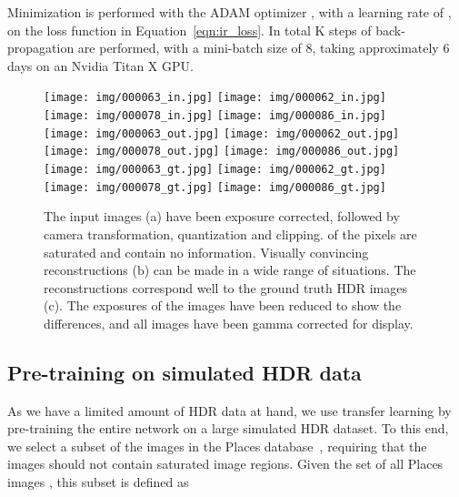 \documentclass[acmtog]{acmart}
\newcommand{\eqnref}[1]{Equation~\ref{eqn:#1}}
\begin{document}
Minimization is performed with the ADAM optimizer \cite{Kingma2014}, with a learning rate of , on the loss function in \eqnref{ir_loss}. In total K steps of back-propagation are performed, with a mini-batch size of 8, taking approximately 6 days on an Nvidia Titan X GPU.

\begin{figure*}
	\vspace{5pt}
	\newcommand\ww{0.241}
	\newcommand\hpad{\hspace{3pt}}
	\newcommand\vpad{\vspace{3pt}}
	\centering
	\hspace{2pt}\texttt{[image: img/000063\_in.jpg]}\hpad
	\texttt{[image: img/000062\_in.jpg]}\hpad
	\texttt{[image: img/000078\_in.jpg]}\hpad
	\texttt{[image: img/000086\_in.jpg]}\vpad\\
	\hspace{2pt}\texttt{[image: img/000063\_out.jpg]}\hpad
	\texttt{[image: img/000062\_out.jpg]}\hpad
	\texttt{[image: img/000078\_out.jpg]}\hpad
	\texttt{[image: img/000086\_out.jpg]}\vpad\\
	\hspace{2pt}\texttt{[image: img/000063\_gt.jpg]}\hpad
	\texttt{[image: img/000062\_gt.jpg]}\hpad
	\texttt{[image: img/000078\_gt.jpg]}\hpad
	\texttt{[image: img/000086\_gt.jpg]}\vpad\\
	\vspace{-2pt}
	\caption{\label{fig:itm_hdr} The input images (a) have been exposure corrected, followed by camera transformation, quantization and clipping.  of the pixels are saturated and contain no information. Visually convincing reconstructions (b) can be made in a wide range of situations. The reconstructions correspond well to the ground truth HDR images (c). The exposures of the images have been reduced to show the differences, and all images have been gamma corrected for display.}
\end{figure*}

\subsection{Pre-training on simulated HDR data}\label{sec:pretrain}
As we have a limited amount of HDR data at hand, we use transfer learning by pre-training the entire network on a large simulated HDR dataset. To this end, we select a subset of the images in the Places database~\cite{Zhou2014}, requiring that the images should not contain saturated image regions. Given the set of all Places images , this subset  is defined as
\end{document}
